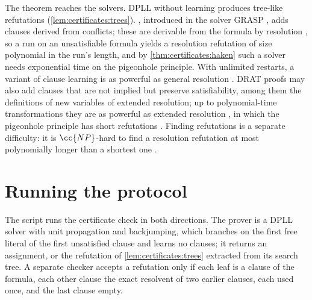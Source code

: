 \begin{refsection}
The theorem reaches the solvers. DPLL without learning produces tree-like refutations (\cref{lem:certificates:trees}). , introduced in the solver GRASP \parencite{MarquesSilvaSakallah1999}, adds clauses derived from conflicts; these are derivable from the formula by resolution \parencite{HeuleKullmannMarek2016}, so a run on an unsatisfiable formula yields a resolution refutation of size polynomial in the run's length, and by \cref{thm:certificates:haken} such a solver needs exponential time on the pigeonhole principle. With unlimited restarts, a variant of clause learning is as powerful as general resolution \parencite{BeameKautzSabharwal2004}. DRAT proofs may also add clauses that are not implied but preserve satisfiability, among them the definitions of new variables of extended resolution; up to polynomial-time transformations they are as powerful as extended resolution \parencite{HeuleKullmannMarek2016,KieslRebolaPardoHeule2018}, in which the pigeonhole principle has short refutations \parencite{Cook1976}. Finding refutations is a separate difficulty: it is $\cc{NP}$-hard to find a resolution refutation at most polynomially longer than a shortest one \parencite{AtseriasMuller2020}.

\section{Running the protocol}\label{sec:certificates:running}

The script  runs the certificate check in both directions. The prover is a DPLL solver with unit propagation and backjumping, which branches on the first free literal of the first unsatisfied clause and learns no clauses; it returns an assignment, or the refutation of \cref{lem:certificates:trees} extracted from its search tree. A separate checker accepts a refutation only if each leaf is a clause of the formula, each other clause the exact resolvent of two earlier clauses, each used once, and the last clause empty.


\end{refsection}
